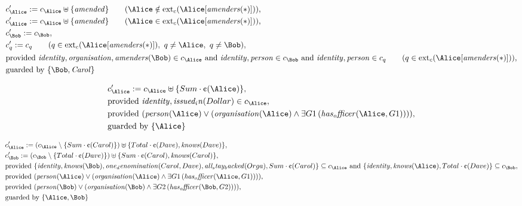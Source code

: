 \begin{align*}
&
c'_
{
\Alice
}
 := 
c_
{
\Alice
}
 \uplus 
\{
\mathit{
amended
}
\}
 \qquad (
\Alice
 \notin 
\mathrm{ext}_c(
\Alice
[
\mathit{
amenders
}
(
\ast
)
]
)
)
,\\
&
c'_
{
\Alice
}
 := 
c_
{
\Alice
}
 \uplus 
\{
\mathit{
amended
}
\}
 \qquad (
\Alice
 \in 
\mathrm{ext}_c(
\Alice
[
\mathit{
amenders
}
(
\ast
)
]
)
)
,\\
&
c'_
{
\Bob
}
 := 
c_
{
\Bob
}
,\\
&
c'_
q
 := 
c_
q
 \qquad (
q
 \in 
\mathrm{ext}_c(
\Alice
[
\mathit{
amenders
}
(
\ast
)
]
)
,\ 
q \neq 
\Alice
,\ 
q \neq 
\Bob
)
,\\
&
\text{provided } 
\mathit{
identity
}
,
\mathit{
organisation
}
,
\mathit{
amenders
}
(
\Bob
)
 \in c_
{
\Alice
}
 \text{ and } 
\mathit{
identity
}
,
\mathit{
person
}
 \in c_
{
\Bob
}
 \text{ and } 
\mathit{
identity
}
,
\mathit{
person
}
 \in c_
q
 \qquad (
q \in 
\mathrm{ext}_c(
\Alice
[
\mathit{
amenders
}
(
\ast
)
]
)
)
,\\
&
\text{guarded by } \{
\Bob
,
\mathit{Carol}
\}
\end{align*}

\begin{align*}
&
c'_
{
\Alice
}
 := 
c_
{
\Alice
}
 \uplus 
\{
Sum
\cdot
\text{\textcent}
(
\Alice
)
\}
,\\
&
\text{provided } 
\mathit{
identity
}
,
\mathit{
issued_in
}
(
Dollar
)
 \in c_
{
\Alice
}
,\\
&
\text{provided } 
(
\mathit{
person
}
(
\Alice
)
\lor
(
\mathit{
organisation
}
(
\Alice
)
\land
\exists 
G1
\,(
\mathit{
has_officer
}
(
\Alice
,
G1
)
)
)
)
,\\
&
\text{guarded by } \{
\Alice
\}
\end{align*}

\begin{align*}
&
c'_
{
\Alice
}
 := 
(c_
{
\Alice
}
 \setminus 
\{
Sum
\cdot
\text{\textcent}
(
Carol
)
\}
) \uplus 
\{
Total
\cdot
\text{\textcent}
(
Dave
)
,
\mathit{
knows
}
(
Dave
)
\}
,\\
&
c'_
{
\Bob
}
 := 
(c_
{
\Bob
}
 \setminus 
\{
Total
\cdot
\text{\textcent}
(
Dave
)
\}
) \uplus 
\{
Sum
\cdot
\text{\textcent}
(
Carol
)
,
\mathit{
knows
}
(
Carol
)
\}
,\\
&
\text{provided } 
\{
\mathit{
identity
}
,
\mathit{
knows
}
(
\Bob
)
,
\mathit{
one_denomination
}
(
Carol
,
Dave
)
,
\mathit{
all_stay_backed
}
(
Orga
)
,
Sum
\cdot
\text{\textcent}
(
Carol
)
\}
 \subseteq c_
{
\Alice
}
 \text{ and } 
\{
\mathit{
identity
}
,
\mathit{
knows
}
(
\Alice
)
,
Total
\cdot
\text{\textcent}
(
Dave
)
\}
 \subseteq c_
{
\Bob
}
,\\
&
\text{provided } 
(
\mathit{
person
}
(
\Alice
)
\lor
(
\mathit{
organisation
}
(
\Alice
)
\land
\exists 
G1
\,(
\mathit{
has_officer
}
(
\Alice
,
G1
)
)
)
)
,\\
&
\text{provided } 
(
\mathit{
person
}
(
\Bob
)
\lor
(
\mathit{
organisation
}
(
\Bob
)
\land
\exists 
G2
\,(
\mathit{
has_officer
}
(
\Bob
,
G2
)
)
)
)
,\\
&
\text{guarded by } \{
\Alice
,
\Bob
\}
\end{align*}
